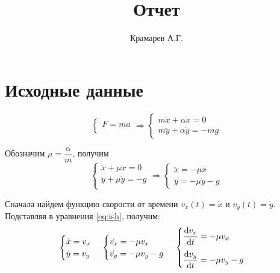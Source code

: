 \documentclass[a4paper, titlepage]{article}
\title{Отчет}
\author{Крамарев А.Г.}
\newcommand*\dd{\mathop{}\!\mathrm{d}}
\begin{document}
\fontsize{14}{16pt}\selectfont

\maketitle %

\section{Исходные данные}


\begin{equation*}
\begin{cases}
	F = m a \\
\end{cases}
\Rightarrow
\begin{cases}
	m\ddot{x} + \alpha\dot{x} = 0 \\
	m\ddot{y} + \alpha\dot{y} = - mg
\end{cases}
\end{equation*}

Обозначим $\mu = \dfrac{\alpha}{m}$, получим
\begin{equation}
\label{eq:ish}
\begin{cases}
    \ddot{x} + \mu\dot{x} = 0 \\
    \ddot{y} + \mu\dot{y} = -g \\
\end{cases}
\Rightarrow
\begin{cases}
    \ddot{x} = -\mu\dot{x} \\
    \ddot{y} = -\mu\dot{y} - g
\end{cases}
\end{equation}

Сначала найдем функцию скорости от времени $v_x(t) = \dot{x}$ и $v_y(t)=\dot{y}$. Подставляя в уравнения \ref{eq:ish}, получим:
\begin{equation}
\label{eq:speed-diff}
\begin{cases}
    \dot{x} = v_x \\
    \dot{y} = v_y
\end{cases}
\\
\begin{cases}
    \dot{v_x} = -\mu v_x \\
    \dot{v_y} = -\mu v_y - g
\end{cases}
\\
\begin{cases}
    \dfrac{\dd v_x}{\dd t} = -\mu v_x  \\[1em]
    \dfrac{\dd v_y}{\dd t} = -\mu v_y - g
\end{cases}
\end{equation}
\end{document}
